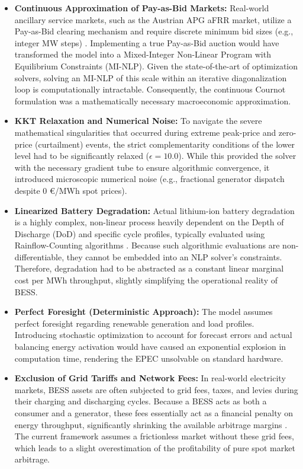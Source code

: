 \begin{itemize}
    \item \textbf{Continuous Approximation of Pay-as-Bid Markets:} Real-world ancillary service markets, such as the Austrian APG aFRR market, utilize a Pay-as-Bid clearing mechanism and require discrete minimum bid sizes (e.g., integer MW steps) \cite{apg_secondary_control}. Implementing a true Pay-as-Bid auction would have transformed the model into a Mixed-Integer Non-Linear Program with Equilibrium Constraints (MI-NLP). Given the state-of-the-art of optimization solvers, solving an MI-NLP of this scale within an iterative diagonalization loop is computationally intractable. Consequently, the continuous Cournot formulation was a mathematically necessary macroeconomic approximation.
    \item \textbf{KKT Relaxation and Numerical Noise:} To navigate the severe mathematical singularities that occurred during extreme peak-price and zero-price (curtailment) events, the strict complementarity conditions of the lower level had to be significantly relaxed ($\epsilon = 10.0$). While this provided the solver with the necessary gradient tube to ensure algorithmic convergence, it introduced microscopic numerical noise (e.g., fractional generator dispatch despite 0 €/MWh spot prices).
    \item \textbf{Linearized Battery Degradation:} Actual lithium-ion battery degradation is a highly complex, non-linear process heavily dependent on the Depth of Discharge (DoD) and specific cycle profiles, typically evaluated using Rainflow-Counting algorithms \cite{shin_optimal_2020}. Because such algorithmic evaluations are non-differentiable, they cannot be embedded into an NLP solver's constraints. Therefore, degradation had to be abstracted as a constant linear marginal cost per MWh throughput, slightly simplifying the operational reality of BESS.
    \item \textbf{Perfect Foresight (Deterministic Approach):} The model assumes perfect foresight regarding renewable generation and load profiles. Introducing stochastic optimization to account for forecast errors and actual balancing energy activation would have caused an exponential explosion in computation time, rendering the EPEC unsolvable on standard hardware.
    \item \textbf{Exclusion of Grid Tariffs and Network Fees:} In real-world electricity markets, BESS assets are often subjected to grid fees, taxes, and levies during their charging and discharging cycles. Because a BESS acts as both a consumer and a generator, these fees essentially act as a financial penalty on energy throughput, significantly shrinking the available arbitrage margins \cite{hameed_business-oriented_2021}. The current framework assumes a frictionless market without these grid fees, which leads to a slight overestimation of the profitability of pure spot market arbitrage.

\end{itemize}
